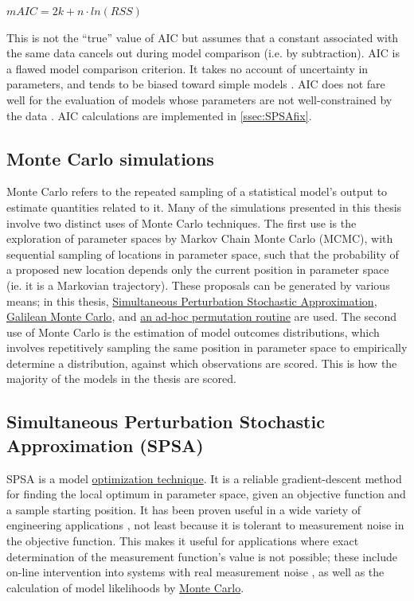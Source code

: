 \documentclass{ut-thesis}
\begin{document}
\begin{NoHyper}
$mAIC = 2k + n \cdot ln(RSS)$ 
\cite{Burnham2002}

This is not the ``true'' value of AIC but assumes that a constant associated with the same data cancels out during model comparison (i.e. by subtraction). AIC is a flawed model comparison criterion. It takes no account of uncertainty in parameters, and tends to be biased toward simple models \cite[p.33]{Bishop2006}. AIC does not fare well for the evaluation of models whose parameters are not well-constrained by the data \cite[p.217]{Bishop2006}. AIC calculations are implemented in \autoref{ssec:SPSAfix}.

\subsection{Monte Carlo simulations}
\label{ssec:MonteCarlo}
Monte Carlo refers to the repeated sampling of a statistical model's output to estimate quantities related to it. Many of the simulations presented in this thesis involve two distinct uses of Monte Carlo techniques. The first use is the exploration of parameter spaces by Markov Chain Monte Carlo (MCMC), with sequential sampling of locations in parameter space, such that the probability of a proposed new location depends only the current position in parameter space (ie. it is a Markovian trajectory). These proposals can be generated by various means; in this thesis, \hyperref[ssec:SPSA]{Simultaneous Perturbation Stochastic Approximation}, \hyperref[ssec:GMC]{Galilean Monte Carlo}, and \hyperref[ssec:adhoc]{an ad-hoc permutation routine} are used. The second use of Monte Carlo is the estimation of model outcomes distributions, which involves repetitively sampling the same position in parameter space to empirically determine a distribution, against which observations are scored. This is how the majority of the models in the thesis are scored. 

\subsection{Simultaneous Perturbation Stochastic Approximation (SPSA)}
\label{ssec:SPSA}
SPSA is a model \hyperref[ssec:MLE]{optimization technique}. It is a reliable gradient-descent method for finding the local optimum in parameter space, given an objective function and a sample starting position. It has been proven useful in a wide variety of engineering applications \cite{Kleinman1997,Zhou2008}, not least because it is tolerant to measurement noise in the objective function. This makes it useful for applications where exact determination of the measurement function's value is not possible; these include on-line intervention into systems with real measurement noise \cite{Zhou2008}, as well as the calculation of model likelihoods by \hyperref[ssec:MonteCarlo]{Monte Carlo}.


\end{NoHyper}
\end{document}
